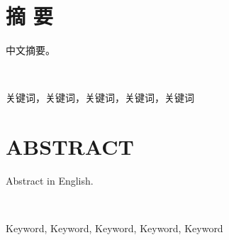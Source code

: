 \chapter*{\songti{}\textbf{摘 \qquad 要}}
\thispagestyle{noheader}

中文摘要。

\

 关键词，关键词，关键词，关键词，关键词

\chapter*{\songti{}\textbf{ABSTRACT}}
\thispagestyle{noheader}

Abstract in English.

\

 Keyword, Keyword, Keyword, Keyword, Keyword
